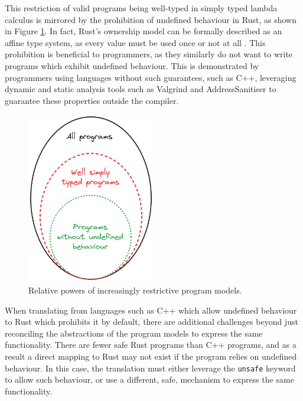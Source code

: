 This restriction of valid programs being well-typed in simply typed lambda calculus is mirrored by the prohibition of undefined behaviour in Rust, as shown in Figure \ref{fig:excalidraw_programs_venn}. In fact, Rust's ownership model can be formally described as an affine type system, as every value must be used once or not at all \cite{reed2015patina}. This prohibition is beneficial to programmers, as they similarly do not want to write programs which exhibit undefined behaviour. This is demonstrated by programmers using languages without such guarantees, such as C++, leveraging dynamic and static analysis tools such as Valgrind \cite{ValgrindHome} and AddressSanitiser \cite{Sanitizers2023} to guarantee these properties outside the compiler.

\begin{figure}[H]
    \centering
    \includegraphics[width=0.5\textwidth]{images/3_translation/excalidraw_programs_venn.png}
    \caption{Relative powers of increasingly restrictive program models.}
    \label{fig:excalidraw_programs_venn}
\end{figure}

When translating from languages such as C++ which allow undefined behaviour to Rust which prohibits it by default, there are additional challenges beyond just reconciling the abstractions of the program models to express the same functionality. There are fewer safe Rust programs than C++ programs, and as a result a direct mapping to Rust may not exist if the program relies on undefined behaviour. In this case, the translation must either leverage the \texttt{unsafe} keyword to allow such behaviour, or use a different, safe, mechanism to express the same functionality.


